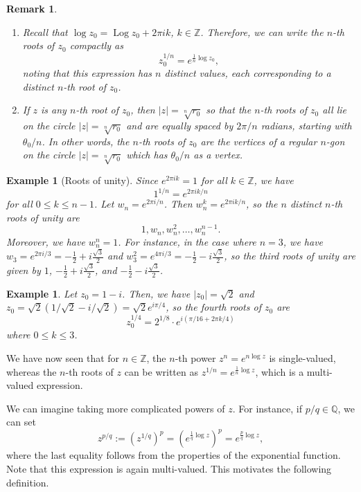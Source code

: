 \documentclass[10pt]{article}
\newcommand{\Z}{\mathbb{Z}}
\newcommand{\Q}{\mathbb{Q}}
\DeclareMathOperator{\Log}{Log}
\theoremstyle{newstyle}
\newtheorem{remark}[thm]{Remark}
\newtheorem{exmp}[thm]{Example}
\begin{document}
\begin{remark}~
\begin{enumerate}[(1)]
    \item Recall that $\log z_0 = \Log z_0 + 2\pi ik$, $k \in \Z$. Therefore, we can write 
    the $n$-th roots of $z_0$ compactly as 
    \[ z_0^{1/n} = e^{\frac1n\log z_0}, \]
    noting that this expression has $n$ distinct values, each corresponding to a distinct $n$-th root of 
    $z_0$. 
    \item If $z$ is any $n$-th root of $z_0$, then $|z| = \sqrt[n]{r_0}$ so that the 
    $n$-th roots of $z_0$ all lie on the circle $|z| = \sqrt[n]{r_0}$ and are equally spaced 
    by $2\pi/n$ radians, starting with $\theta_0/n$. In other words, the $n$-th roots 
    of $z_0$ are the vertices of a regular $n$-gon on the circle $|z| = \sqrt[n]{r_0}$ 
    which has $\theta_0/n$ as a vertex.
\end{enumerate}
\end{remark}

\begin{exmp}[Roots of unity]
Since $e^{2\pi ik} = 1$ for all $k \in \Z$, we have 
\[ 1^{1/n} = e^{2\pi ik/n} \]
for all $0 \leq k \leq n-1$. Let $w_n = e^{2\pi i/n}$. Then 
$w_n^k = e^{2\pi ik/n}$, so the $n$ distinct $n$-th roots of unity are 
\[ 1, w_n, w_n^2, \dots, w_n^{n-1}. \]
Moreover, we have $w_n^n = 1$. For instance, in the case where $n = 3$, we have 
$w_3 = e^{2\pi i/3} = -\frac12 + i\frac{\sqrt3}2$ and $w_3^2 
= e^{4\pi i/3} = -\frac12 - i\frac{\sqrt3}2$, so the third roots of unity are given by 
$1$, $-\frac12 + i\frac{\sqrt3}2$, and $-\frac12 - i\frac{\sqrt3}2$.
\end{exmp}

\begin{exmp}
Let $z_0 = 1-i$. Then, we have $|z_0| = \sqrt2$ and $z_0 = \sqrt2 (1/\sqrt2 - i/\sqrt2)
= \sqrt2 e^{i\pi/4}$, so the fourth roots of $z_0$ are 
\[ z_0^{1/4} = 2^{1/8} \cdot  e^{i(\pi/16 + 2\pi k/4)} \]
where $0 \leq k \leq 3$. 
\end{exmp}

We have now seen that for $n \in \Z$, the $n$-th power $z^n = e^{n\log z}$ is single-valued, whereas the 
$n$-th roots of $z$ can be written as $z^{1/n} = e^{\frac1n\log z}$, which is a multi-valued 
expression. 

We can imagine taking more complicated powers of $z$. For instance, if $p/q \in \Q$, we can set 
\[ z^{p/q} := (z^{1/q})^p = (e^{\frac1q\log z})^p = e^{\frac pq\log z}, \]
where the last equality follows from the properties of the exponential function. 
Note that this expression is again multi-valued. This motivates the following definition. 
\end{document}
